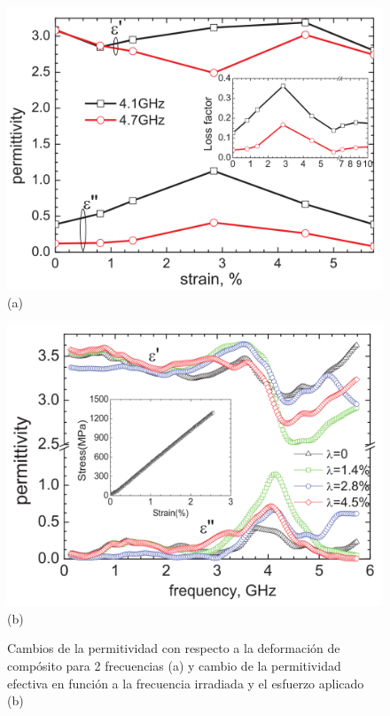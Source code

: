 \documentclass[12pt,letterpaper]{article}
\numberwithin{equation}{section}
\begin{document}
\begin{figure}[H]
	\begin{minipage}{0.5\linewidth}
		\centering\includegraphics[scale=0.23]{Imagenes/Permitividadvsdeformacion.png}\\
		\centering(a)
	\end{minipage}
	\begin{minipage}{0.5\linewidth}
		\centering\includegraphics[scale=0.23]{Imagenes/Permitividadesfuerzo.png}\\
		\centering(b)
	\end{minipage}
	\caption{Cambios de la permitividad con respecto a la deformación de compósito para 2 frecuencias (a) y cambio de la permitividad efectiva en función a la frecuencia irradiada y el esfuerzo aplicado (b)}
	\label{fig:Permitividad_esfuerzo}
\end{figure}
\end{document}
